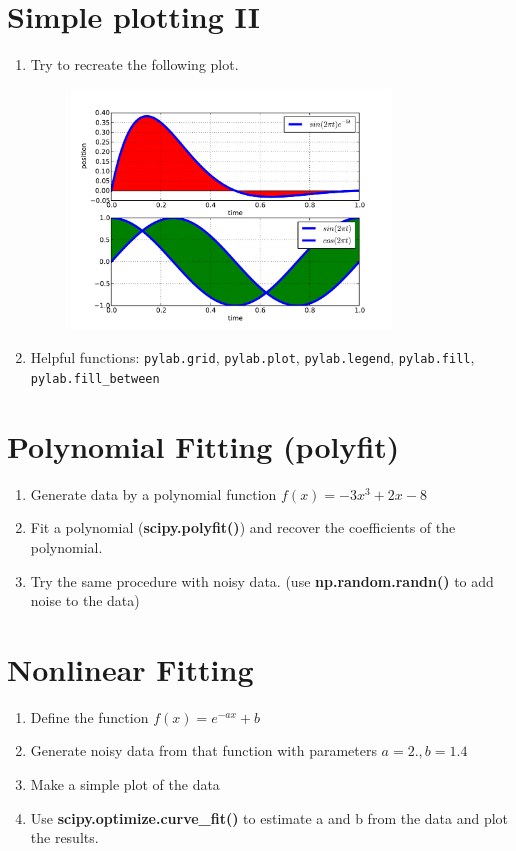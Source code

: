 \documentclass[smallheadings,12pt]{scrartcl}
\begin{document}
\section{Simple plotting II}
\begin {enumerate}
\item Try to recreate the following plot.
\begin{figure}[H]
  \centering
  \includegraphics[width=0.8\textwidth]{pics/simple-plot-2}
\end{figure}
\item[] Helpful functions: {\tt pylab.grid}, {\tt pylab.plot}, {\tt pylab.legend}, {\tt pylab.fill}, {\tt pylab.fill\_between }
\end {enumerate}


\section{Polynomial Fitting (polyfit)}
\begin{enumerate}
 \item Generate data by a polynomial function $f(x) = -3x^3 + 2x -8$
 \item Fit a polynomial (\textbf{scipy.polyfit()}) and recover the coefficients of the polynomial. 
 \item Try the same procedure with noisy data.
(use  \textbf{np.random.randn()} to add noise to the data)
\end{enumerate}

\section{Nonlinear Fitting}
\begin{enumerate}
  \item Define the function $f(x) = e^{-ax} + b$
  \item Generate noisy data from that function with parameters $a = 2., b = 1.4$
  \item Make a simple plot of the data
  \item Use \textbf{scipy.optimize.curve\_fit()} to estimate a and b from the 
data and plot the results.
\end{enumerate}
\end{document}
